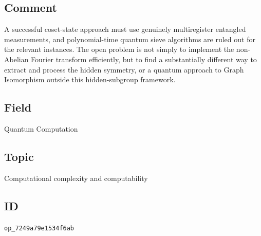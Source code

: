 \subsection*{Comment}

A successful coset-state approach must use genuinely multiregister entangled
measurements, and polynomial-time quantum sieve algorithms are ruled out for
the relevant instances.  The open problem is not simply to implement the
non-Abelian Fourier transform efficiently, but to find a substantially
different way to extract and process the hidden symmetry, or a quantum
approach to Graph Isomorphism outside this hidden-subgroup framework.

\subsection*{Field}

Quantum Computation

\subsection*{Topic}

Computational complexity and computability

\subsection*{ID}

\texttt{op\_7249a79e1534f6ab}
